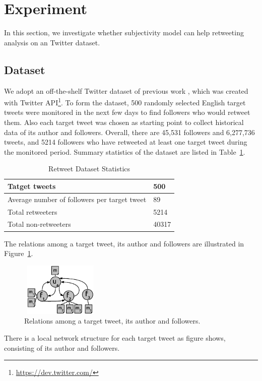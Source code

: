 \documentclass[twocolumn]{svjour3}          %
\begin{document}
\section{Experiment}
\label{experiment}

In this section, we investigate whether subjectivity model can help retweeting analysis on an Twitter dataset. 

\subsection{Dataset}

We adopt an off-the-shelf Twitter dataset of previous work \cite{Luo:2013RMF}, which was created with Twitter API\footnote{\url{https://dev.twitter.com/}}.
To form the dataset, 500 randomly selected English target tweets were monitored in the next few days to find followers who would retweet them. Also each target tweet was chosen as starting point to collect historical data of its author and followers. 
Overall, there are 45,531 followers and 6,277,736 tweets, and 5214 followers who have retweeted at least one target tweet during the monitored period. Summary statistics of the dataset are listed in Table~\ref{datasetstat}.
\begin{table}
\centering
\caption{Retweet Dataset Statistics}
\label{datasetstat}
\begin{tabular}{ll}
\hline
Tatget tweets  & 500 \\
\hline
Average number of followers per target tweet & 89 \\
Total retweeters & 5214 \\
Total non-retweeters & 40317  \\
\hline
\end{tabular}
\end{table}

The relations among a target tweet, its author and followers are illustrated in Figure~\ref{fig2}.
\begin{figure}[htb]
\centering
\includegraphics[width=1.5in,height=1.0in]{fig2.eps}
\caption{Relations among a target tweet, its author and followers.}
\label{fig2}
\end{figure}
There is a local network structure for each target tweet as figure shows, consisting of its author and followers.
\end{document}
